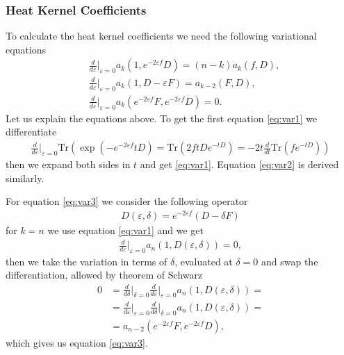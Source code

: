 \subsubsection{Heat Kernel Coefficients}
To calculate the heat kernel coefficients we need the following variational
equations
\begin{align}
    &\frac{d}{d\varepsilon}\bigg|_{\varepsilon=0}a_k(1, e^{-2\varepsilon f}D) =
    (n-k) a_k(f, D),\label{eq:var1}\\
    &\frac{d}{d\varepsilon}\bigg|_{\varepsilon=0}a_k(1, D-\varepsilon F) =
    a_{k-2}(F,D),\label{eq:var2}\\
    &\frac{d}{d\varepsilon}\bigg|_{\varepsilon=0}a_k(e^{-2\varepsilon f}F,
    e^{-2\varepsilon f}D) =
    0\label{eq:var3}.
\end{align}
Let us explain the equations above. To get the first equation \ref{eq:var1}
we differentiate \begin{align}
    \frac{d}{d\varepsilon}\bigg|_{\varepsilon=0} \text{Tr}(\exp(-e^{-2\varepsilon
    f}tD) = \text{Tr}(2ftDe^{-tD}) = -2t\frac{d}{dt}\text{Tr}(fe^{-tD}))
\end{align}
then we expand both sides in $t$ and get \ref{eq:var1}. Equation \ref{eq:var2} is derived similarly.

For equation \ref{eq:var3} we consider the following operator
\begin{align}
    D(\varepsilon,\delta) = e^{-2\varepsilon f}(D-\delta F)
\end{align}
for $k=n$ we use equation \ref{eq:var1} and we get
\begin{align}
    \frac{d}{d\varepsilon}\bigg|_{\varepsilon=0}a_n(1,D(\varepsilon,\delta))
    =0,
\end{align}
then we take the variation in terms of $\delta$, evaluated at $\delta =0$ and
swap the differentiation, allowed by theorem of Schwarz
\begin{align}
    0 &=
    \frac{d}{d\delta}\bigg|_{\delta=0}\frac{d}{d\varepsilon}\bigg|_{\varepsilon=0}a_n(1,
    D(\varepsilon,\delta)) =\\
      &=\frac{d}{d\varepsilon}\bigg|_{\varepsilon=0}\frac{d}{d\delta}\bigg|_{\delta=0}a_n(1,
    D(\varepsilon,\delta)) =\\
      &=a_{n-2} ( e^{-2\varepsilon f}F, e^{-2\varepsilon f}D),
\end{align}
which gives us equation \ref{eq:var3}.

